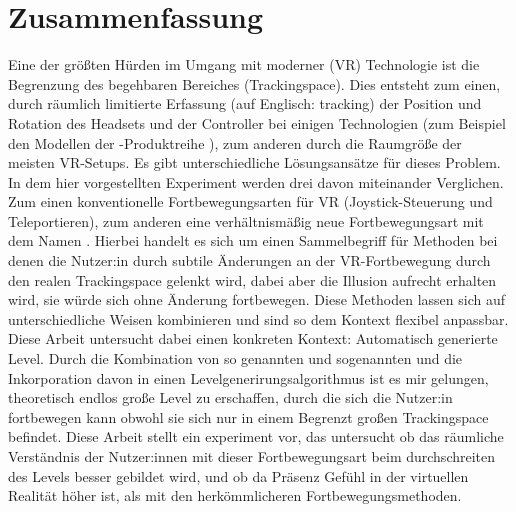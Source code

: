 \chapter*{Zusammenfassung}
Eine der größten Hürden im Umgang mit moderner  (VR) Technologie ist die Begrenzung des begehbaren Bereiches (Trackingspace). Dies entsteht zum einen, durch räumlich limitierte Erfassung (auf Englisch: tracking) der Position und Rotation des Headsets und der Controller bei einigen Technologien (zum Beispiel den Modellen der -Produktreihe
), zum anderen durch die Raumgröße der meisten VR-Setups. Es gibt unterschiedliche Lösungsansätze für dieses Problem. In dem hier vorgestellten Experiment werden drei davon miteinander Verglichen. Zum einen konventionelle Fortbewegungsarten für VR (Joystick-Steuerung und Teleportieren), zum anderen eine verhältnismäßig neue Fortbewegungsart mit dem Namen . Hierbei handelt es sich um einen Sammelbegriff für Methoden bei denen die Nutzer:in durch subtile Änderungen an der VR-Fortbewegung durch den realen Trackingspace gelenkt wird, dabei aber die Illusion aufrecht erhalten wird, sie würde sich ohne Änderung fortbewegen. Diese Methoden lassen sich auf unterschiedliche Weisen kombinieren und sind so dem Kontext flexibel anpassbar. Diese Arbeit untersucht dabei einen konkreten Kontext: Automatisch generierte Level. Durch die Kombination von so genannten  und sogenannten  und die Inkorporation davon in einen Levelgenerirungsalgorithmus ist es mir gelungen, theoretisch endlos große Level zu erschaffen, durch die sich die Nutzer:in fortbewegen kann obwohl sie sich nur in einem Begrenzt großen Trackingspace befindet. Diese Arbeit stellt ein experiment vor, das untersucht ob das räumliche Verständnis der Nutzer:innen mit dieser Fortbewegungsart beim durchschreiten des Levels besser gebildet wird, und ob da Präsenz Gefühl in der virtuellen Realität höher ist, als mit den herkömmlicheren Fortbewegungsmethoden.



